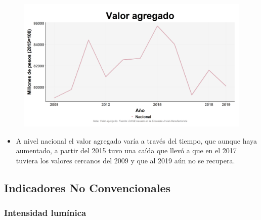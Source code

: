     \begin{figure}[H]
        \caption[Valor agregado a nivel nacional ]{\label{valor_agreg_nacional} }
        \begin{center}
        \includegraphics[width=\textwidth,keepaspectratio]{img/var_227_trend.png}
        \end{center}
    \end{figure}
            \begin{itemize}
                    \item A nivel nacional el valor agregado varía a través del tiempo, que aunque haya aumentado, a partir del 2015 tuvo una caída que llevó a que en el 2017 tuviera los valores cercanos del 2009 y que al 2019 aún no se recupera.
                    \end{itemize}

    \subsection{Indicadores No Convencionales}
        \subsubsection{Intensidad lumínica}

